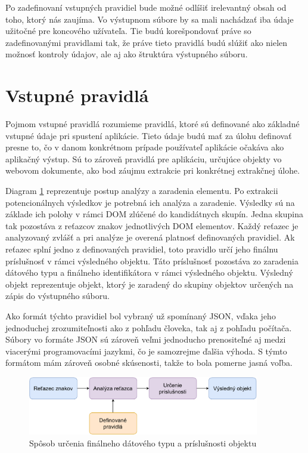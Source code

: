 Po zadefinovaní vstupných pravidiel bude možné odlíšiť irelevantný obsah od toho, ktorý nás zaujíma. Vo výstupnom súbore by sa mali nachádzať iba údaje užitočné pre koncového užívateľa. Tie budú korešpondovať práve so zadefinovanými pravidlami tak, že práve tieto pravidlá budú slúžiť ako nielen možnosť kontroly údajov, ale aj ako štruktúra výstupného súboru. 

\newpage
\section{Vstupné pravidlá}

Pojmom vstupné pravidlá rozumieme pravidlá, ktoré sú definované ako základné vstupné údaje pri spustení aplikácie. Tieto údaje budú mať za úlohu definovať presne to, čo v danom konkrétnom prípade používateľ aplikácie očakáva ako aplikačný výstup. Sú to zároveň pravidlá pre aplikáciu, určujúce objekty vo webovom dokumente, ako bod záujmu extrakcie pri konkrétnej extrakčnej úlohe. 

Diagram \ref{rules} reprezentuje postup analýzy a zaradenia elementu. Po extrakcii potencionálnych výsledkov je potrebná ich analýza a zaradenie. Výsledky sú na základe ich polohy v rámci DOM zlúčené do kandidátnych skupín. Jedna skupina tak pozostáva z reťazcov znakov jednotlivých DOM elementov. Každý reťazec je analyzovaný zvlášť a pri analýze je overená platnosť definovaných pravidiel. Ak reťazec splní jedno z definovaných pravidiel, toto pravidlo určí jeho finálnu príslušnosť v rámci výsledného objektu. Táto príslušnosť pozostáva zo zaradenia dátového typu a finálneho identifikátora v rámci výsledného objektu. Výsledný objekt reprezentuje objekt, ktorý je zaradený do skupiny objektov určených na zápis do výstupného súboru.

Ako formát týchto pravidiel bol vybraný už spomínaný JSON, vďaka jeho jednoduchej zrozumiteľnosti ako z pohľadu človeka, tak aj z pohľadu počítača. Súbory vo formáte JSON sú zároveň veľmi jednoducho prenositeľné aj medzi viacerými programovacími jazykmi, čo je samozrejme ďalšia výhoda. S týmto formátom mám zároveň osobné skúsenosti, takže to bola pomerne jasná voľba.

\bigskip

\begin{figure}[hbt]
	\centering
	\includegraphics[width=0.9\textwidth]{obrazky-figures/rules.pdf}
	\caption{Spôsob určenia finálneho dátového typu a príslušnosti objektu}
	\label{rules}
\end{figure}

